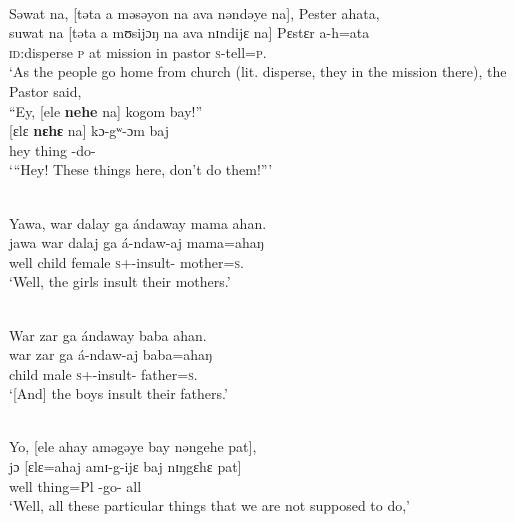 \ea \label{ex:3:61}\\
 Səwat  na,  [təta  a  məsəyon  na  ava  nəndəye  {na}],  Pester  ahata,      \\
\gll  suwat na   [təta   a   mʊsijɔŋ   na   ava nɪndijɛ  na]   Pɛstɛr    a-h=ata\\
      \textsc{id}:disperse  {\PSP}  \textsc{p}  at  mission  {\PSP}  in  {\DEM}  {\PSP}  pastor  \textsc{s}-tell=\textsc{p}.{\IO}\\
\glt  ‘As the people go home from church (lit. disperse, they in the mission there), the Pastor said, \\
\medskip
    “Ey, [ele \textbf{nehe} na] kogom  bay!”\\
 [{ɛlɛ} {\textbf{nɛhɛ}} na] kɔ-gʷ-ɔm   baj\\
      hey  thing  {\DEM}  {\PSP}  -do-{\twoP}    {\NEG}\\
\glt ‘“Hey! These things here, don’t do them!”’

\medskip 
{}\\
{Yawa,  war  dalay  ga ándaway  mama  ahan}.\\
\gll jawa   war   dalaj  ga  á-ndaw-aj   mama=ahaŋ\\
     well    child  female  {\ADJ}  \textsc{s}+{\IFV}-insult{}-{\CL}  mother=\textsc{s}.{\POSS}  \\
\glt ‘Well, the girls insult their mothers.’ 

\medskip
{}\\
War  zar  ga  ándaway  baba  ahan.\\
\gll war     zar  ga  á-ndaw-aj   baba=ahaŋ\\
    child  male  {\ADJ}  \textsc{s}+{\IFV}-insult{}-{\CL}  father=\textsc{s}.{\POSS}\\
\glt ‘[And] the boys insult their fathers.’ 

\clearpage
{}\\ 
Yo, [ele  ahay  aməgəye  bay  nəngehe pat],\\
\gll jɔ   [ɛlɛ=ahaj  amɪ-g-ijɛ            baj   nɪŋgɛhɛ   pat] \\
   well    thing=Pl  {\DEP}-go-{\CL}     {\NEG}  {\DEM}     all  \\
\glt ‘Well, all these particular things that we are not supposed to do,’ 
   
\medskip

